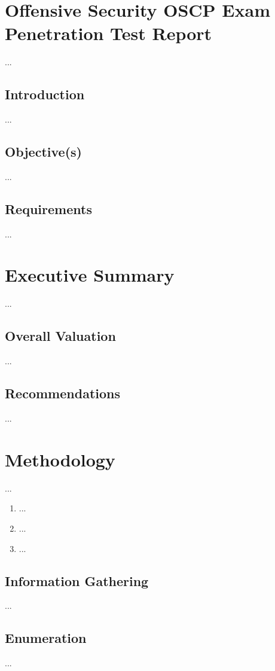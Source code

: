 %
%
%
\section{Offensive Security OSCP Exam Penetration Test Report}\label{sec:sec1}
%
...
%
%
%
\subsection{Introduction}\label{sec:sec1-intro}
%
...
%
%
%
\subsection{Objective(s)}\label{sec:sec1-obj}
%
...
%
%
%
\subsection{Requirements}\label{sec:sec1-req}
%
...
%
%
%
\section{Executive Summary}\label{sec:sec2}
%
...
%
%
%
\subsection{Overall Valuation}\label{sec:sec2-overall}
%
...
%
%
%
\subsection{Recommendations}\label{sec:sec2-recom}
%
...
%
%
%
\section{Methodology}\label{sec:sec3}
%
...

\begin{enumerate}
    \item ...
    \item ...
    \item ...
\end{enumerate}
%
%
%
\subsection{Information Gathering}\label{sec:sec3-infogath}
%
...
%
%
%
\subsection{Enumeration}\label{sec:sec3-enum}
%
...
%
%
%
